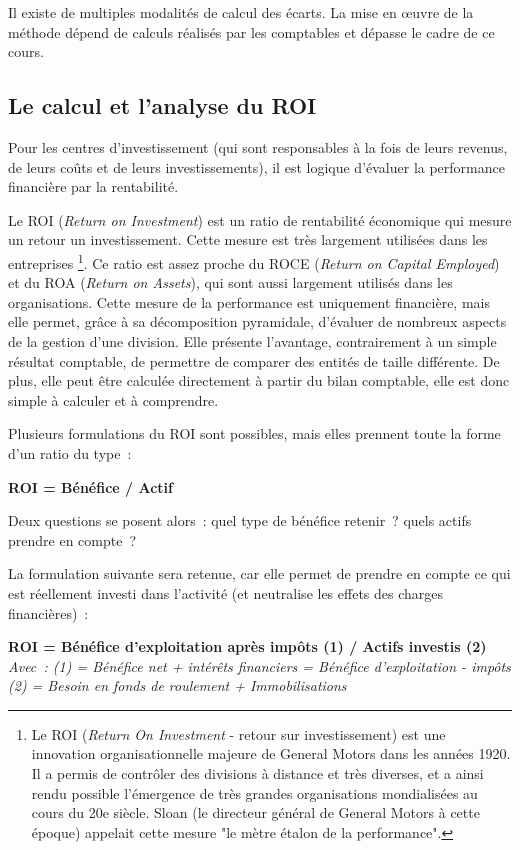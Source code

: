 \documentclass[oneside]{kaobook}
\begin{document}
\begin{kaowarn}
Il existe de multiples modalités de calcul des écarts. La mise en œuvre de la méthode dépend de calculs réalisés par les comptables et dépasse le cadre de ce cours.
\end{kaowarn}

\subsection{Le calcul et l'analyse du ROI}
\label{sec:org18df295}
Pour les centres d'investissement (qui sont responsables à la fois de leurs revenus, de leurs coûts et de leurs investissements), il est logique d'évaluer la performance financière par la rentabilité.

Le ROI (\emph{Return on Investment}) est un ratio de rentabilité économique qui mesure un retour un investissement. Cette mesure est très largement utilisées dans les entreprises \footnote{Le ROI (\emph{Return On Investment} - retour sur investissement) est une innovation organisationnelle majeure de General Motors dans les années 1920. Il a permis de contrôler des divisions à distance et très diverses, et a ainsi rendu possible l'émergence de très grandes organisations mondialisées au cours du 20e siècle. Sloan (le directeur général de General Motors à cette époque) appelait cette mesure "le mètre étalon de la performance".}. Ce ratio est assez proche du ROCE (\emph{Return on Capital Employed}) et du ROA (\emph{Return on Assets}), qui sont aussi largement utilisés dans les organisations. Cette mesure de la performance est uniquement financière, mais elle permet, grâce à sa décomposition pyramidale, d'évaluer de nombreux aspects de la gestion d'une division. Elle présente l'avantage, contrairement à un simple résultat comptable, de permettre de comparer des entités de taille différente. De plus, elle peut être calculée directement à partir du bilan comptable, elle est donc simple à calculer et à comprendre.

Plusieurs formulations du ROI sont possibles, mais elles prennent toute la forme d'un ratio du type : 
\begin{center}
\textbf{ROI = Bénéfice / Actif}
\end{center}

Deux questions se posent alors : quel type de bénéfice retenir ? quels actifs prendre en compte ? 

La formulation suivante sera retenue, car elle permet de prendre en compte ce qui est réellement investi dans l'activité (et neutralise les effets des charges financières) :
\begin{center}
\textbf{ROI = Bénéfice d'exploitation après impôts (1) / Actifs investis (2)}
\emph{Avec : (1) = Bénéfice net + intérêts financiers = Bénéfice d'exploitation - impôts (2) = Besoin en fonds de roulement + Immobilisations}
\end{center}
\end{document}
